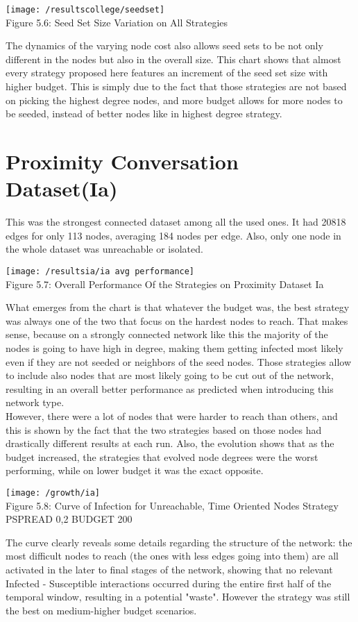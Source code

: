 \begin{center}
    \texttt{[image: /resultscollege/seedset]}
    \\
    Figure 5.6: Seed Set Size Variation on All Strategies
\end{center}
 The dynamics of the varying node cost also allows seed sets to be not only different in the nodes but also in the overall size. This chart shows that almost every strategy proposed here features an increment of the seed set size with higher budget. This is simply due to the fact that those strategies are not based on picking the highest degree nodes, and more budget allows for more nodes to be seeded, instead of better nodes like in highest degree strategy.

\section{Proximity Conversation Dataset(Ia)}
\label{sec:iares}
This was the strongest connected dataset among all the used ones. It had 20818 edges for only 113 nodes, averaging 184 nodes per edge. Also, only one node in the whole dataset was unreachable or isolated.
\begin{center}
    \texttt{[image: /resultsia/ia avg performance]}
    \\
    Figure 5.7: Overall Performance Of the Strategies on Proximity Dataset Ia
\end{center}

What emerges from the chart is that whatever the budget was, the best strategy was always one of the two that focus on the hardest nodes to reach. That makes sense, because on a strongly connected network like this the majority of the nodes is going to have high in degree, making them getting infected most likely even if they are not seeded or neighbors of the seed nodes. Those strategies allow to include also nodes that are most likely going to be cut out of the network, resulting in an overall better performance as predicted when introducing this network type. \\
However, there were a lot of nodes that were harder to reach than others, and this is shown by the fact that the two strategies based on those nodes had drastically different results at each run. Also, the evolution shows that as the budget increased, the strategies that evolved node degrees were the worst performing, while on lower budget it was the exact opposite.

\begin{center}
    \texttt{[image: /growth/ia]}
    \\
    Figure 5.8: Curve of Infection for Unreachable, Time Oriented Nodes Strategy PSPREAD 0,2 BUDGET 200
\end{center}
The curve clearly reveals some details regarding the structure of the network: the most difficult nodes to reach (the ones with less edges going into them) are all activated in the later to final stages of the network, showing that no relevant Infected - Susceptible interactions occurred during the entire first half of the temporal window, resulting in a potential "waste". However the strategy was still the best on medium-higher budget scenarios.

